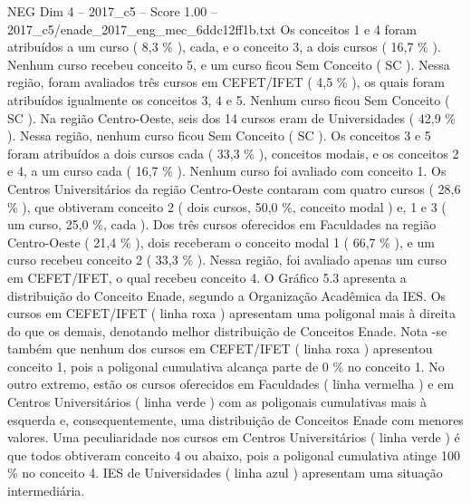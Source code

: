 \begin{textsample}{NEG Dim 4 – 2017\_c5 – Score 1.00 – 2017\_c5/enade\_2017\_eng\_mec\_6ddc12ff1b.txt}
Os conceitos 1 e 4 foram atribuídos a um curso ( 8,3 \% ), cada, e o conceito 3, a dois cursos ( 16,7 \% ).
Nenhum curso recebeu conceito 5, e um curso ficou Sem Conceito ( SC ).
Nessa região, foram avaliados três cursos em CEFET/IFET ( 4,5 \% ), os quais foram atribuídos igualmente os conceitos 3, 4 e 5.
Nenhum curso ficou Sem Conceito ( SC ).
Na região Centro-Oeste, seis dos 14 cursos eram de Universidades ( 42,9 \% ).
Nessa região, nenhum curso ficou Sem Conceito ( SC ).
Os conceitos 3 e 5 foram atribuídos a dois cursos cada ( 33,3 \% ), conceitos modais, e os conceitos 2 e 4, a um curso cada ( 16,7 \% ).
Nenhum curso foi avaliado com conceito 1.
Os Centros Universitários da região Centro-Oeste contaram com quatro cursos ( 28,6 \% ), que obtiveram conceito 2 ( dois cursos, 50,0 \%, conceito modal ) e, 1 e 3 ( um curso, 25,0 \%, cada ).
Dos três cursos oferecidos em Faculdades na região Centro-Oeste ( 21,4 \% ), dois receberam o conceito modal 1 ( 66,7 \% ), e um curso recebeu conceito 2 ( 33,3 \% ).
Nessa região, foi avaliado apenas um curso em CEFET/IFET, o qual recebeu conceito 4.
O Gráfico 5.3 apresenta a distribuição do Conceito Enade, segundo a Organização Acadêmica da IES.
Os cursos em CEFET/IFET ( linha roxa ) apresentam uma poligonal mais à direita do que os demais, denotando melhor distribuição de Conceitos Enade.
Nota -se também que nenhum dos cursos em CEFET/IFET ( linha roxa ) apresentou conceito 1, pois a poligonal cumulativa alcança parte de 0 \% no conceito 1.
No outro extremo, estão os cursos oferecidos em Faculdades ( linha vermelha ) e em Centros Universitários ( linha verde ) com as poligonais cumulativas mais à esquerda e, consequentemente, uma distribuição de Conceitos Enade com menores valores.
Uma peculiaridade nos cursos em Centros Universitários ( linha verde ) é que todos obtiveram conceito 4 ou abaixo, pois a poligonal cumulativa atinge 100 \% no conceito 4.
IES de Universidades ( linha azul ) apresentam uma situação intermediária.

\end{textsample}
